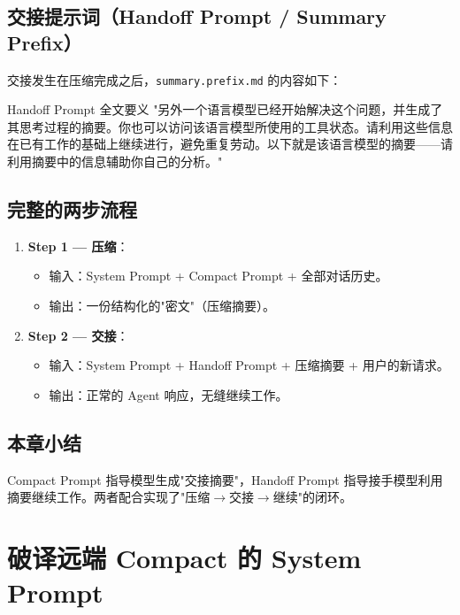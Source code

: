 \documentclass[a4paper]{article}
\begin{document}
\subsection{交接提示词（Handoff Prompt / Summary Prefix）}

交接发生在压缩完成之后，\texttt{summary.prefix.md} 的内容如下：

\begin{importantbox}{Handoff Prompt 全文要义}
"另外一个语言模型已经开始解决这个问题，并生成了其思考过程的摘要。你也可以访问该语言模型所使用的工具状态。请利用这些信息在已有工作的基础上继续进行，避免重复劳动。以下就是该语言模型的摘要——请利用摘要中的信息辅助你自己的分析。"
\end{importantbox}

\subsection{完整的两步流程}

\begin{enumerate}
    \item \textbf{Step 1 — 压缩}：
    \begin{itemize}
        \item 输入：System Prompt + Compact Prompt + 全部对话历史。
        \item 输出：一份结构化的"密文"（压缩摘要）。
    \end{itemize}
    \item \textbf{Step 2 — 交接}：
    \begin{itemize}
        \item 输入：System Prompt + Handoff Prompt + 压缩摘要 + 用户的新请求。
        \item 输出：正常的 Agent 响应，无缝继续工作。
    \end{itemize}
\end{enumerate}

\subsection{本章小结}

Compact Prompt 指导模型生成"交接摘要"，Handoff Prompt 指导接手模型利用摘要继续工作。两者配合实现了"压缩$\rightarrow$交接$\rightarrow$继续"的闭环。


\section{破译远端 Compact 的 System Prompt}
\end{document}
